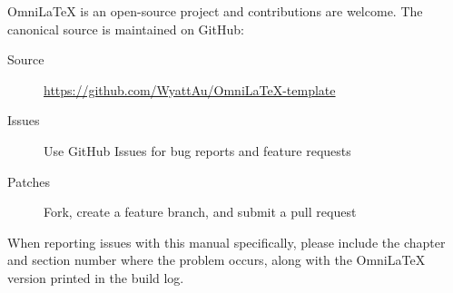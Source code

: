 OmniLaTeX is an open-source project and contributions are welcome.
The canonical source is maintained on GitHub:

\begin{description}
    \item[Source] \url{https://github.com/WyattAu/OmniLaTeX-template}
    \item[Issues] Use GitHub Issues for bug reports and feature requests
    \item[Patches] Fork, create a feature branch, and submit a pull request
\end{description}

When reporting issues with this manual specifically, please include the
chapter and section number where the problem occurs, along with the OmniLaTeX
version printed in the build log.

\cleardoubleoddpage
{}
